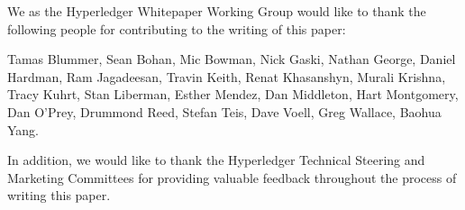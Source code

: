 We as the Hyperledger Whitepaper Working Group would like to thank the following people for contributing to the writing of this paper:

Tamas Blummer, Sean Bohan, Mic Bowman, Nick Gaski, Nathan George, Daniel Hardman, Ram Jagadeesan, Travin Keith, Renat Khasanshyn, Murali Krishna, Tracy Kuhrt, Stan Liberman, Esther Mendez, Dan Middleton, Hart Montgomery, Dan O'Prey, Drummond Reed, Stefan Teis, Dave Voell, Greg Wallace, Baohua Yang.

In addition, we would like to thank the Hyperledger Technical Steering and Marketing Committees for providing valuable feedback throughout the process of writing this paper.
